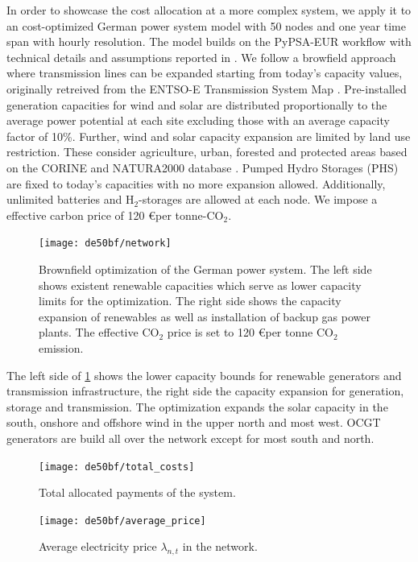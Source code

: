 \documentclass[11pt,twocolumn]{article}
\newcommand{\lmp}[1][n]{\lambda_{#1,t}}
\begin{document}
In order to showcase the cost allocation at a more complex system, we apply it to an cost-optimized German power system model with 50 nodes and one year time span with hourly resolution. The model builds on the PyPSA-EUR workflow \cite{horsch_pypsa-eur_2020} with technical details and assumptions reported in \cite{horsch_pypsa-eur_2018}. We follow a browfield approach where transmission lines can be expanded starting from today's capacity values, originally retreived from the ENTSO-E Transmission System Map \cite{entsoe-e_entso-e_nodate}. Pre-installed generation capacities for wind and solar are distributed proportionally to the average power potential at each site excluding those with an average capacity factor of 10\%. Further, wind and solar capacity expansion are limited by land use restriction. These consider agriculture, urban, forested and protected areas based on the CORINE and NATURA2000 database \cite{corine2012,natura2000}. Pumped Hydro Storages (PHS) are fixed to today's capacities with no more expansion allowed. Additionally, unlimited batteries and H$_{2}$-storages are allowed at each node. We impose a effective carbon price of 120 \euro per tonne-CO$_{2}$. 

\begin{figure}
    \centering
    \texttt{[image: de50bf/network]}
    \label{fig:network}
    \caption{Brownfield optimization of the German power system. The left side shows existent renewable capacities which serve as lower capacity limits for the optimization. The right side shows the capacity expansion of renewables as well as installation of backup gas power plants. The effective CO$_2$ price is set to 120 \euro per tonne CO$_2$ emission.}
\end{figure}
The left side of \cref{fig:network} shows the lower capacity bounds for renewable generators and transmission infrastructure, the right side the capacity expansion for generation, storage and transmission. The optimization expands the solar capacity in the south, onshore and offshore wind in the upper north and most west. OCGT generators are build all over the network except for most south and north.  

\begin{figure}
    \centering
    \texttt{[image: de50bf/total\_costs]}
    \label{fig:total_cost}
    \caption{Total allocated payments of the system. }
\end{figure}

\begin{figure}
    \centering
    \texttt{[image: de50bf/average\_price]}
    \label{fig:average_price}
    \caption{Average electricity price $\lmp$ in the network.}
\end{figure}
 
\end{document}
